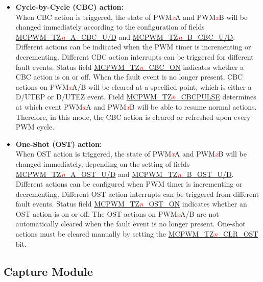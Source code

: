\documentclass[main\_\_EN.tex]{subfiles}
\begin{document}
\begin{itemize}
    \item {\bfseries Cycle-by-Cycle (CBC) action:}\\
    When CBC action is triggered, the state of PWM\textcolor{red}{\it{x}}A and PWM\textcolor{red}{\it{x}}B will be changed immediately according to the configuration of fields \hyperref[fielddesc:MCPWMTZNACBCU]{MCPWM\_TZ\textcolor{red}{\it{n}}\_A\_CBC\_U/D} and \hyperref[fielddesc:MCPWMTZNBCBCU]{MCPWM\_TZ\textcolor{red}{\it{n}}\_B\_CBC\_U/D}. Different actions can be indicated when the PWM timer is incrementing or decrementing. Different CBC action interrupts can be triggered for different fault events. Status field \hyperref[fielddesc:MCPWMTZNCBCON]{MCPWM\_TZ\textcolor{red}{\it{n}}\_CBC\_ON} indicates whether a CBC action is on or off.
   When the fault event is no longer present, CBC actions on PWM\textcolor{red}{\it{x}}A/B will be cleared at a specified point, which is either a D/UTEP or D/UTEZ event. Field \hyperref[fielddesc:MCPWMTZNCBCPULSE]{MCPWM\_TZ\textcolor{red}{\it{n}}\_CBCPULSE} determines at which event PWM\textcolor{red}{\it{x}}A and PWM\textcolor{red}{\it{x}}B will be able to resume normal actions. Therefore, in this mode, the CBC action is cleared or refreshed upon every PWM cycle.
    \item {\bfseries One-Shot (OST) action:}\\
	When OST action is triggered, the state of PWM\textcolor{red}{\it{x}}A and PWM\textcolor{red}{\it{x}}B will be changed immediately, depending on the setting of fields \hyperref[fielddesc:MCPWMTZNAOSTU]{MCPWM\_TZ\textcolor{red}{\it{n}}\_A\_OST\_U/D} and \hyperref[fielddesc:MCPWMTZNBOSTU]{MCPWM\_TZ\textcolor{red}{\it{n}}\_B\_OST\_U/D}. Different actions can be configured when PWM timer is incrementing or decrementing. Different OST action interrupts can be triggered from different fault events. Status field \hyperref[fielddesc:MCPWMTZNOSTON]{MCPWM\_TZ\textcolor{red}{\it{n}}\_OST\_ON} indicates whether an OST action is on or off.
    The OST actions on PWM\textcolor{red}{\it{x}}A/B are not automatically cleared when the fault event is no longer present. One-shot actions must be cleared manually by setting the \hyperref[fielddesc:MCPWMTZNCLROST]{MCPWM\_TZ\textcolor{red}{\it{n}}\_CLR\_OST} bit.
\end{itemize}

\subsection{Capture Module}
\end{document}
